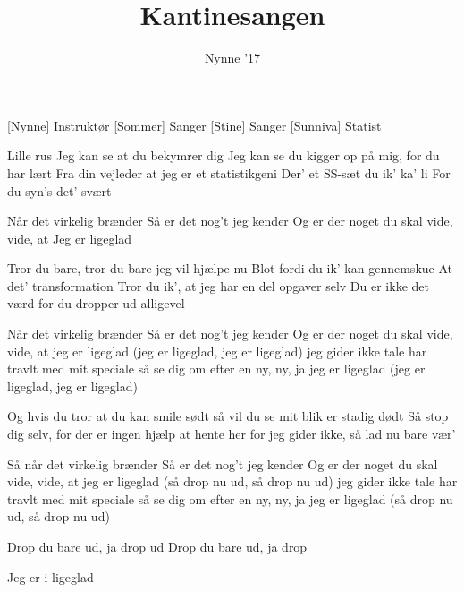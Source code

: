 \documentclass[a4paper,11pt]{article}
\title{Kantinesangen}
\author{Nynne '17}
\begin{document}
\maketitle

\begin{roles}
[Nynne] Instruktør
[Sommer] Sanger
[Stine] Sanger
[Sunniva] Statist
\end{roles}

\begin{song}
 Lille rus
Jeg kan se at du bekymrer dig
Jeg kan se du kigger op på mig, for du har lært
Fra din vejleder at jeg er et statistikgeni
Der' et SS-sæt du ik' ka' li
For du syn's det' svært

 Når det virkelig brænder
Så er det nog't jeg kender
Og er der noget du skal vide, vide, at
Jeg er ligeglad

 Tror du bare, tror du bare jeg vil hjælpe nu
Blot fordi du ik' kan gennemskue
At det' transformation
Tror du ik', at jeg har en del opgaver selv
Du er ikke det værd for du dropper ud alligevel

 Når det virkelig brænder
Så er det nog't jeg kender
Og er der noget du skal vide, vide, at
jeg er ligeglad (jeg er ligeglad, jeg er ligeglad)
jeg gider ikke tale
har travlt med mit speciale
så se dig om efter en ny, ny, ja
jeg er ligeglad (jeg er ligeglad, jeg er ligeglad)

 Og hvis du tror at du kan smile sødt
så vil du se mit blik er stadig dødt
Så stop dig selv, for der er ingen hjælp at hente her
for jeg gider ikke, så lad nu bare vær'

 Så når det virkelig brænder
Så er det nog't jeg kender
Og er der noget du skal vide, vide, at
jeg er ligeglad (så drop nu ud, så drop nu ud)
jeg gider ikke tale
har travlt med mit speciale
så se dig om efter en ny, ny, ja
jeg er ligeglad (så drop nu ud, så drop nu ud)

Drop du bare ud, ja drop ud
Drop du bare ud, ja drop

Jeg er i ligeglad
\end{song}
\end{document}
